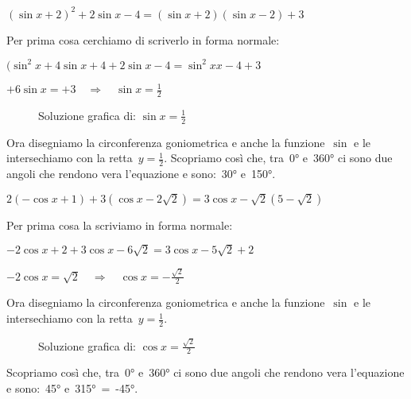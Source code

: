  \begin{esempio}
  $(\sin x +2)^2 + 2 \sin x -4 = (\sin x +2)(\sin x -2)+3$
  
  Per prima cosa cerchiamo di scriverlo in forma normale:
  
  $(\sin^2 x +4 \sin x +4 + 2 \sin x -4 = \sin^2x x -4 +3$
  
  $+6 \sin x = +3 \quad \Rightarrow \quad \sin x = \frac{1}{2}$
  
\begin{figure}[!h] 
 \vspace{-6pt}
  \begin{center}
\begin{inaccessibleblock}[Soluzione grafica dell'equazione: 
    $\sin x = \frac{1}{2}$.]
    
    \caption{Soluzione grafica di: $\sin x = \frac{1}{2}$}
    \label{fig:trigo_equazione01}
\end{inaccessibleblock}
  \end{center}
\vspace{-18pt}
\end{figure} 

  Ora disegniamo la circonferenza goniometrica e anche la funzione~$\sin$ 
  e le intersechiamo con la retta~$y=\frac{1}{2}$.
  Scopriamo così che, tra~0° e~360° ci sono due angoli che rendono vera 
  l'equazione e sono:~30° e~150°. 
 \end{esempio}

 \begin{esempio}
  $2 ( -\cos x +1) + 3 (\cos x -2 \sqrt{2}) = 3 \cos x -\sqrt{2} (5 -\sqrt{2})$
  
  Per prima cosa la scriviamo in forma normale:
  
  $- 2 \cos x +2 + 3 \cos x -6 \sqrt{2} = 3 \cos x -5 \sqrt{2} +2$
  
  $-2 \cos x  = \sqrt{2} \quad \Rightarrow \quad \cos x  = -\frac{\sqrt{2}}{2}$
  
  Ora disegniamo la circonferenza goniometrica e anche la funzione~$\sin$ 
  e le intersechiamo con la retta~$y=\frac{1}{2}$.
  
\begin{figure}[!h] 
 \vspace{-6pt}
  \begin{center}
\begin{inaccessibleblock}[Soluzione grafica dell'equazione: 
    $\cos x = \frac{\sqrt{2}}{2}$.]
    
    \caption{Soluzione grafica di: $\cos x = \frac{\sqrt{2}}{2}$}
    \label{fig:trigo_equazione02}
\end{inaccessibleblock}
  \end{center}
\vspace{-18pt}
\end{figure} 
  Scopriamo così che, tra~0° e~360° ci sono due angoli che rendono vera 
  l'equazione e sono:~45° e~315°~=~-45°. 
 \end{esempio}

